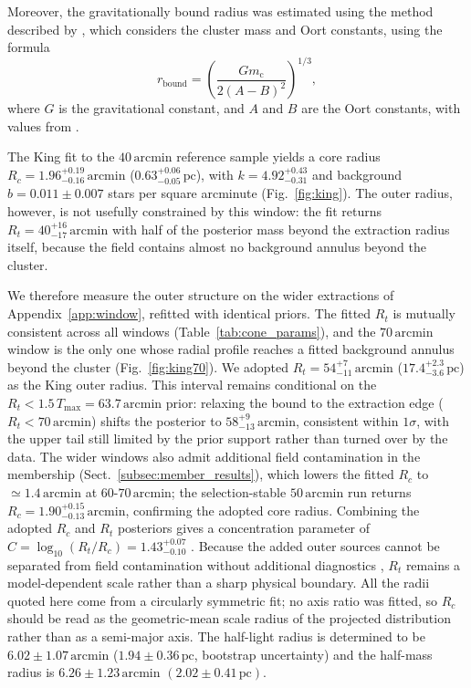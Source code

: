 \documentclass{aa}
\begin{document}
Moreover, the gravitationally bound radius was estimated using the method described by \citet{1998MNRAS.299..955P}, which considers the cluster mass and Oort constants, using the formula
\begin{equation}
	r_\mathrm{bound} = \left( \frac{Gm_{\mathrm{c}}}{2(A-B)^2} \right)^{1/3},
\end{equation}
where $G$ is the gravitational constant, and $A$ and $B$ are the Oort constants, with values from \citet{2017MNRAS.468L..63B}.

The King fit to the $40\,\mathrm{arcmin}$ reference sample yields a core radius $R_c = 1.96^{+0.19}_{-0.16}\,\mathrm{arcmin}$ ($0.63^{+0.06}_{-0.05}\,\mathrm{pc}$), with $k = 4.92^{+0.43}_{-0.31}$ and background $b = 0.011\pm0.007$ stars per square arcminute (Fig.~\ref{fig:king}). The outer radius, however, is not usefully constrained by this window: the fit returns $R_t = 40^{+16}_{-17}\,\mathrm{arcmin}$ with half of the posterior mass beyond the extraction radius itself, because the field contains almost no background annulus beyond the cluster.

We therefore measure the outer structure on the wider extractions of Appendix~\ref{app:window}, refitted with identical priors. The fitted $R_t$ is mutually consistent across all windows (Table~\ref{tab:cone_params}), and the $70\,\mathrm{arcmin}$ window is the only one whose radial profile reaches a fitted background annulus beyond the cluster (Fig.~\ref{fig:king70}). We adopted $R_t = 54^{+7}_{-11}\,\mathrm{arcmin}$ ($17.4^{+2.3}_{-3.6}\,\mathrm{pc}$) as the King outer radius. This interval remains conditional on the $R_t<1.5\,T_{\mathrm{max}}=63.7\,\mathrm{arcmin}$ prior: relaxing the bound to the extraction edge ($R_t<70\,\mathrm{arcmin}$) shifts the posterior to $58^{+9}_{-13}\,\mathrm{arcmin}$, consistent within $1\sigma$, with the upper tail still limited by the prior support rather than turned over by the data. The wider windows also admit additional field contamination in the membership (Sect.~\ref{subsec:member_results}), which lowers the fitted $R_c$ to $\simeq1.4\,\mathrm{arcmin}$ at $60$-$70\,\mathrm{arcmin}$; the selection-stable $50\,\mathrm{arcmin}$ run returns $R_c = 1.90^{+0.15}_{-0.13}\,\mathrm{arcmin}$, confirming the adopted core radius. Combining the adopted $R_c$ and $R_t$ posteriors gives a concentration parameter of $C = \log_{10}(R_t/R_c) = 1.43^{+0.07}_{-0.10}$ \citep{1975AJ.....80..427P}. Because the added outer sources cannot be separated from field contamination without additional diagnostics \citep{2025A&A...694A.258R,2025A&A...698A.156X}, $R_t$ remains a model-dependent scale rather than a sharp physical boundary. All the radii quoted here come from a circularly symmetric fit; no axis ratio was fitted, so $R_c$ should be read as the geometric-mean scale radius of the projected distribution rather than as a semi-major axis. The half-light radius is determined to be $6.02 \pm 1.07\,\mathrm{arcmin}$ ($1.94 \pm 0.36\,\mathrm{pc}$, bootstrap uncertainty) and the half-mass radius is $6.26 \pm 1.23\,\mathrm{arcmin}$ $(2.02 \pm 0.41\,\mathrm{pc})$.
\end{document}
